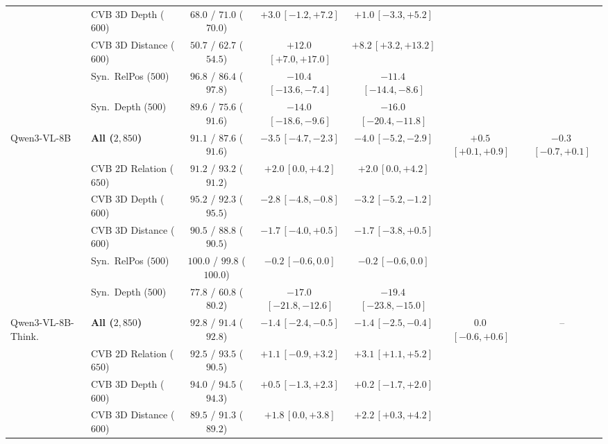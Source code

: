 \begin{tabular}{@{}llccccc@{}}
 & CVB 3D Depth ($600$) & $68.0$ / $71.0$ ($70.0$) & $+3.0$\,{\scriptsize$[-1.2, +7.2]$} & $+1.0$\,{\scriptsize$[-3.3, +5.2]$} & & \\
 & CVB 3D Distance ($600$) & $50.7$ / $62.7$ ($54.5$) & $+12.0$\,{\scriptsize$[+7.0, +17.0]$} & $+8.2$\,{\scriptsize$[+3.2, +13.2]$} & & \\
 & Syn.\ RelPos ($500$) & $96.8$ / $86.4$ ($97.8$) & $-10.4$\,{\scriptsize$[-13.6, -7.4]$} & $-11.4$\,{\scriptsize$[-14.4, -8.6]$} & & \\
 & Syn.\ Depth ($500$) & $89.6$ / $75.6$ ($91.6$) & $-14.0$\,{\scriptsize$[-18.6, -9.6]$} & $-16.0$\,{\scriptsize$[-20.4, -11.8]$} & & \\
\midrule
Qwen3-VL-8B & \textbf{All ($2{,}850$)} & $91.1$ / $87.6$ ($91.6$) & $-3.5$\,{\scriptsize$[-4.7, -2.3]$} & $-4.0$\,{\scriptsize$[-5.2, -2.9]$} & $+0.5$\,{\scriptsize$[+0.1, +0.9]$} & $-0.3$\,{\scriptsize$[-0.7, +0.1]$} \\
 & CVB 2D Relation ($650$) & $91.2$ / $93.2$ ($91.2$) & $+2.0$\,{\scriptsize$[0.0, +4.2]$} & $+2.0$\,{\scriptsize$[0.0, +4.2]$} & & \\
 & CVB 3D Depth ($600$) & $95.2$ / $92.3$ ($95.5$) & $-2.8$\,{\scriptsize$[-4.8, -0.8]$} & $-3.2$\,{\scriptsize$[-5.2, -1.2]$} & & \\
 & CVB 3D Distance ($600$) & $90.5$ / $88.8$ ($90.5$) & $-1.7$\,{\scriptsize$[-4.0, +0.5]$} & $-1.7$\,{\scriptsize$[-3.8, +0.5]$} & & \\
 & Syn.\ RelPos ($500$) & $100.0$ / $99.8$ ($100.0$) & $-0.2$\,{\scriptsize$[-0.6, 0.0]$} & $-0.2$\,{\scriptsize$[-0.6, 0.0]$} & & \\
 & Syn.\ Depth ($500$) & $77.8$ / $60.8$ ($80.2$) & $-17.0$\,{\scriptsize$[-21.8, -12.6]$} & $-19.4$\,{\scriptsize$[-23.8, -15.0]$} & & \\
\midrule
Qwen3-VL-8B-Think. & \textbf{All ($2{,}850$)} & $92.8$ / $91.4$ ($92.8$) & $-1.4$\,{\scriptsize$[-2.4, -0.5]$} & $-1.4$\,{\scriptsize$[-2.5, -0.4]$} & $0.0$\,{\scriptsize$[-0.6, +0.6]$} & -- \\
 & CVB 2D Relation ($650$) & $92.5$ / $93.5$ ($90.5$) & $+1.1$\,{\scriptsize$[-0.9, +3.2]$} & $+3.1$\,{\scriptsize$[+1.1, +5.2]$} & & \\
 & CVB 3D Depth ($600$) & $94.0$ / $94.5$ ($94.3$) & $+0.5$\,{\scriptsize$[-1.3, +2.3]$} & $+0.2$\,{\scriptsize$[-1.7, +2.0]$} & & \\
 & CVB 3D Distance ($600$) & $89.5$ / $91.3$ ($89.2$) & $+1.8$\,{\scriptsize$[0.0, +3.8]$} & $+2.2$\,{\scriptsize$[+0.3, +4.2]$} & & \\

\end{tabular}
